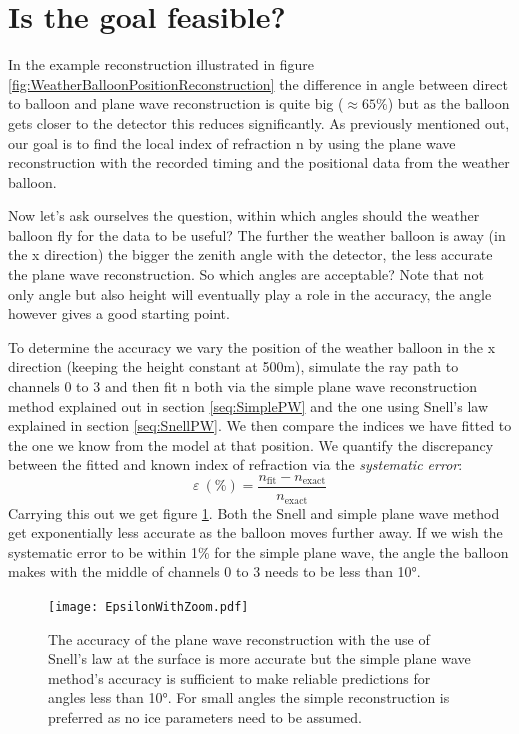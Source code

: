 \section{Is the goal feasible?}
\label{sec:feasible}
In the example reconstruction illustrated in figure
\ref{fig:WeatherBalloonPositionReconstruction} the difference in angle between
direct to balloon and plane wave reconstruction is quite big
($\approx 65\%$) but as the balloon gets closer to the detector this reduces
significantly. As previously mentioned out, our goal is to find the local index of refraction n by using the
plane wave reconstruction with the recorded timing and the positional data from
the weather balloon.

Now let's ask ourselves the question, within which angles should the
weather balloon fly for the data to be useful?  The
further the weather balloon is away (in the x direction) the bigger the zenith
angle with the detector, the less accurate the plane wave reconstruction.  So
which angles are acceptable? Note that not only angle but also height will eventually
play a role in the accuracy, the angle however gives a good starting point.

To determine the accuracy we vary the position of the weather balloon in the x direction (keeping the
height constant at 500m), simulate the ray path to channels 0 to 3 and then fit n
both via the simple plane wave reconstruction method explained out in section \ref{seq:SimplePW} and
the one using Snell's law explained in section \ref{seq:SnellPW}.
We then compare the indices we have fitted  to the
one we know from the model at that position.  We quantify the discrepancy
between the fitted and known index of refraction via the
\textit{systematic error}:
\begin{equation}
  \varepsilon\ (\%) = \frac{n_\text{fit} - n_{\text{exact}}}{n_{\text{exact}}}
\end{equation}
Carrying this out we get figure
\ref{fig:EpsilonIFODirect}. Both the Snell and simple plane wave method get
exponentially less accurate as the balloon moves further away.  If we wish the
systematic error to be within 1\% for the simple plane wave, the angle the
balloon makes with the middle of channels 0 to 3 needs to be less than 10°.
\begin{figure}
	\centering
	\texttt{[image: EpsilonWithZoom.pdf]}
	\caption{The accuracy of the plane wave reconstruction with the use of Snell's law at the surface is more 
  accurate but the simple plane wave method's accuracy is sufficient to make reliable
predictions for angles less than 10°. For small angles the simple reconstruction is preferred as no ice 
parameters need to be assumed.}
	\label{fig:EpsilonIFODirect}
\end{figure}

